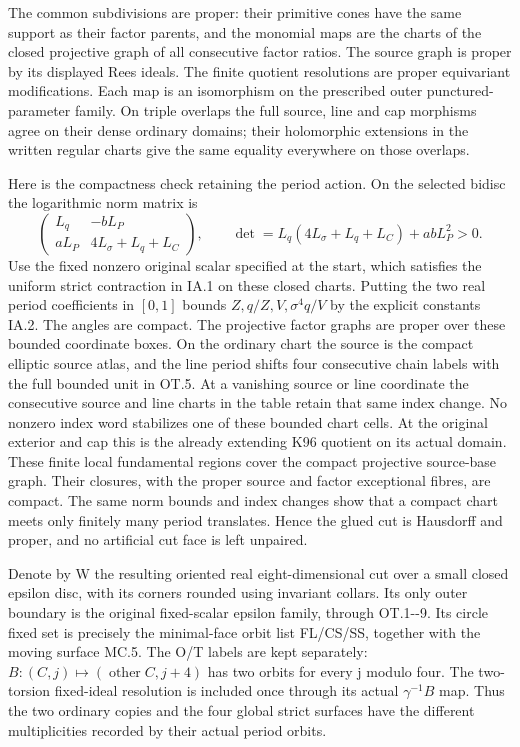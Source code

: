 The common subdivisions are proper: their primitive cones have
the same support as their factor parents, and the monomial maps
are the charts of the closed projective graph of all consecutive
factor ratios. The source graph is proper by its displayed Rees
ideals. The finite quotient resolutions are proper equivariant
modifications. Each map is an isomorphism on the prescribed outer
punctured-parameter family. On triple overlaps the full source,
line and cap morphisms agree on their dense ordinary domains;
their holomorphic extensions in the written regular charts give
the same equality everywhere on those overlaps.

Here is the compactness check retaining the period action. On the
selected bidisc the logarithmic norm matrix is
\[
\begin{pmatrix}L_q&-bL_P\\aL_P&4L_\sigma+L_q+L_C\end{pmatrix},
\qquad
\det=L_q(4L_\sigma+L_q+L_C)+abL_P^2>0.                 \tag{OT.10}
\]
Use the fixed nonzero original scalar specified at the start,
which satisfies the uniform strict contraction in IA.1 on these
closed charts.
Putting the two real period coefficients in \([0,1]\) bounds
\(Z,q/Z,V,\sigma^4q/V\) by the explicit constants IA.2. The
angles are compact. The projective factor graphs are proper over
these bounded coordinate boxes. On the ordinary chart the source
is the compact elliptic source atlas, and the line period shifts
four consecutive chain labels with the full bounded unit in OT.5.
At a vanishing source or line coordinate the consecutive source
and line charts in the table retain that same index change.
No nonzero index word stabilizes one of these bounded chart cells.
At the original exterior and cap this is the already extending
K96 quotient on its actual domain. These finite local fundamental
regions cover the compact projective source-base graph. Their
closures, with the proper source and factor exceptional fibres,
are compact. The same norm bounds and index changes show that a
compact chart meets only finitely many period translates. Hence
the glued cut is Hausdorff and proper, and no artificial cut face
is left unpaired.

Denote by W the resulting oriented real eight-dimensional cut
over a small closed epsilon disc, with its corners rounded using
invariant collars. Its only outer boundary is the original
fixed-scalar epsilon family, through OT.1-\/-9. Its circle fixed set
is precisely the minimal-face orbit list FL/CS/SS, together with
the moving surface MC.5. The O/T labels are kept separately:
\(B:(C,j)\mapsto(\operatorname{other}C,j+4)\) has two orbits
for every j modulo four. The two-torsion fixed-ideal resolution is
included once through its actual \(\gamma^{-1}B\) map. Thus the
two ordinary copies and the four global strict surfaces have the
different multiplicities recorded by their actual period orbits.

